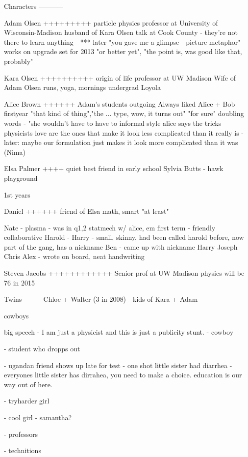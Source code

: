 
Characters
-----------

Adam Olsen
+++++++++
 particle physics professor at University of Wisconsin-Madison
 husband of Kara Olsen
 talk at Cook County
  - they're not there to learn anything
   - *** later "you gave me a glimpse - picture metaphor" 
 works on upgrade set for 2013
  "or better yet", "the point is, was good like that, probably"

 
Kara Olsen 
++++++++++
 origin of life professor at UW Madison
 Wife of Adam Olsen
 runs, yoga, mornings
 undergrad Loyola

Alice Brown
++++++
 Adam's students
 outgoing
 Always liked Alice + Bob
 firstyear
 "that kind of thing","the ... type, wow, it turns out" "for sure" doubling words - "she wouldn't have to have to 
 informal style
 alice says the tricks physicists love are the ones that make it look less complicated than it really is
  - later: maybe our formulation just makes it look more complicated than it was (Nima)

Elsa Palmer
++++
 quiet
 best friend in early school Sylvia Butts
 - hawk playground

1st years

Daniel
++++++
 friend of Elsa 
 math, smart
 "at least" 

Nate
 - plasma
 - was in q1,2 statmech w/ alice, em first term
 - friendly collaborative
Harold
 - Harry
 - small, skinny, had been called harold before, now part of the gang, has a nickname
Ben
 - came up with nickname Harry
Joseph
Chris
Alex
 - wrote on board, neat handwriting



Steven Jacobs
++++++++++++
 Senior prof at UW Madison physics
 will be 76 in 2015

Twins
--------
Chloe + Walter (3 in 2008)
 - kids of Kara + Adam

cowboys


big speech
 - I am just a physicist and this is just a publicity stunt.
  - cowboy


- student who dropps out

- ugandan
  friend shows up late for test - one shot
  little sister had diarrhea
  - everyones little sister has dirrahea, you need to make a choice. education is our way out of here.

- tryharder girl

- cool girl
 - samantha?

- professors

- technitions

